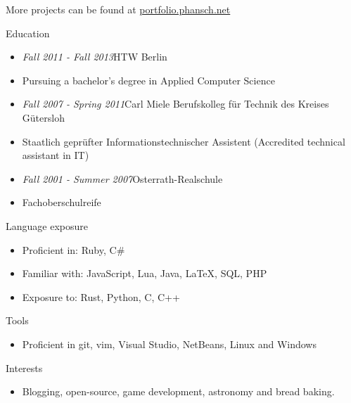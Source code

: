 \documentclass[12pt]{article}
\begin{document}
More projects can be found at \href{http://phansch.net/}{portfolio.phansch.net}

\vspace{0.5cm}
{\Large Education}

\begin{itemize}
  \setlength{\itemsep}{0cm}
  \setlength{\parskip}{0.1cm}
  \item[] \emph{Fall 2011 - Fall 2013}\hfill HTW Berlin
  \item[] Pursuing a bachelor's degree in Applied Computer Science
\end{itemize}

\begin{itemize}
  \setlength{\itemsep}{0cm}
  \setlength{\parskip}{0.1cm}
  \item[] \emph{Fall 2007 - Spring 2011}\hfill Carl Miele Berufskolleg für Technik des Kreises Gütersloh
  \item[] Staatlich geprüfter Informationstechnischer Assistent (Accredited technical assistant in IT)
\end{itemize}

\begin{itemize}
  \setlength{\itemsep}{0cm}
  \setlength{\parskip}{0.1cm}
  \item[] \emph{Fall 2001 - Summer 2007}\hfill Osterrath-Realschule
  \item[] Fachoberschulreife
\end{itemize}

\newpage

\vspace{0.5cm}
{\Large Language exposure}
\begin{itemize}
  \setlength{\itemsep}{0cm}
  \setlength{\parskip}{0cm}
  \item[] Proficient in: Ruby, C#
  \item[] Familiar with: JavaScript, Lua, Java, LaTeX, SQL, PHP
  \item[] Exposure to: Rust, Python, C, C++
\end{itemize}

\vspace{0.5cm}
{\Large Tools}
\begin{itemize}
  \setlength{\itemsep}{0cm}
  \setlength{\parskip}{0cm}
  \item[] Proficient in git, vim, Visual Studio, NetBeans, Linux and Windows
\end{itemize}

\vspace{0.5cm}
{\Large Interests}
\begin{itemize}
  \setlength{\itemsep}{0cm}
  \setlength{\parskip}{0cm}
  \item[] Blogging, open-source, game development, astronomy and bread baking.
\end{itemize}
\end{document}
